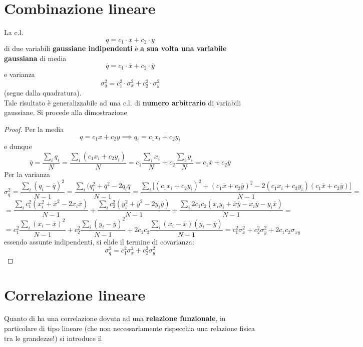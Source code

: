 \documentclass[10pt, oneside]{book}
\newcommand{\cov}{\sigma_{xy}}
\begin{document}
\section{Combinazione lineare}
La c.l. 
\[q = c_1 \cdot x + c_2 \cdot y\]
di due variabili \textbf{gaussiane indipendenti} è \textbf{a sua volta una variabile gaussiana} di media
\[\overline{q} = c_1 \cdot \overline{x} + c_2 \cdot \overline{y}\]
e varianza
\[\sigma_q^2 = c_1^2 \cdot \sigma_x^2 + c_2^2 \cdot \sigma_y^2\]
(segue dalla quadratura).\\
Tale risultato è generalizzabile ad una c.l. di \textbf{numero arbitrario} di variabili gaussiane. Si procede alla dimostrazione
\begin{proof}
Per la media
\[q = c_1 x + c_2 y \implies q_i = c_1 x_i + c_2 y_i\]
e dunque
\[\overline{q} = \frac{\sum_i q_i}{N}= \frac{\sum_i (c_1 x_i + c_2 y_i)}{N} = c_1 \frac{\sum_i x_i}{N} + c_2 \frac{\sum_i y_i}{N} = c_1 \overline{x} + c_2 \overline{y}\]
Per la varianza
\[\sigma_q^2 = \frac{\sum_i (q_i - \overline{q})^2}{N-1} = \frac{\sum_i (q_i^2 + \overline{q}^2 - 2 q_i \overline{q}}{N-1} = \frac{\sum_i \big[(c_1 x_i + c_2 y_i)^2 + (c_1 \overline{x} + c_2 \overline{y})^2 - 2 (c_1 x_i + c_2 y_i) (c_1 \overline{x} + c_2 \overline{y})\big]}{N-1} =\]
\[= \frac{\sum_i c_1^2 (x_i^2 + \overline{x}^2 - 2 x_i \overline{x})}{N-1} + \frac{\sum_i c_2^2 (y_i^2 + \overline{y}^2 - 2 y_i \overline{y})}{N-1} + \frac{\sum_i 2 c_1 c_2 (x_i y_i + \overline{x} \overline{y} - x_i \overline{y} - y_i \overline{x})}{N-1}=\]
\[= c_1^2 \frac{\sum_i (x_i - \overline{x})^2}{N-1} + c_2^2 \frac{\sum_i (y_i - \overline{y})^2}{N-1} + 2 c_1 c_2 \frac{\sum_i (x_i - \overline{x}) (y_i - \overline{y})}{N-1} = c_1^2 \sigma_x^2 + c_2^2 \sigma_y^2 + 2 c_1 c_2 \cov\]
essendo assunte indipendenti, si elide il termine di covarianza:
\[\sigma_q^2 = c_1^2 \sigma_x^2 + c_2^2 \sigma_y^2\]
\end{proof}

\section{Correlazione lineare}
Quanto di ha una correlazione dovuta ad una \textbf{relazione funzionale}, in particolare di tipo lineare (che non necessariamente rispecchia una relazione fisica tra le grandezze!) si introduce il 
\end{document}
